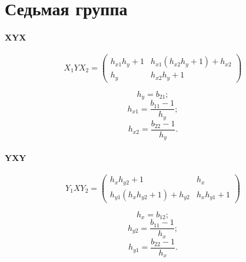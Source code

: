 \section{Седьмая группа}

\paragraph{XYX}

$$X_1YX_2 =
\begin{pmatrix}
	h_{x1}h_y + 1 & h_{x1}\left(h_{x2}h_y + 1\right) + h_{x2} \\
	h_y & h_{x2}h_y + 1
\end{pmatrix}$$

$$h_y = b_{21};$$
$$h_{x1} = \frac{b_{11} - 1}{h_y};$$
$$h_{x2} = \frac{b_{22} - 1}{h_y}.$$

\paragraph{YXY}

$$Y_1XY_2 = 
\begin{pmatrix}
h_x h_{y2} + 1 & h_x \\
h_{y1} \left( {h_x} {h_{y2}}+1\right) +{h_{y2}} & {h_x} {h_{y1}} + 1
\end{pmatrix}
$$

$$h_x = b_{12};$$
$$h_{y2} = \frac{b_{11} - 1}{h_x};$$
$$h_{y1} = \frac{b_{22} - 1}{h_x}.$$
